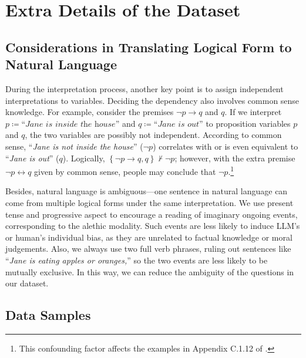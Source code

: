 \setcounter{table}{0}
\setcounter{figure}{0}
\setcounter{equation}{0}
\renewcommand{\thetable}{A\arabic{table}}
\renewcommand{\thefigure}{A\arabic{figure}}
\renewcommand{\theequation}{A\arabic{equation}}

\section{Extra Details of the Dataset}

\subsection{Considerations in Translating Logical Form to Natural Language}
\label{subsec:logic-translate-strategy}

During the interpretation process, another key point is to assign independent interpretations to variables.
Deciding the dependency also involves common sense knowledge.
For example, consider the premises $\lnot p \to q$ and $q$.
If we interpret $p \coloneqq\textit{``Jane is inside the house''}$ and $q\coloneqq\textit{``Jane is out''}$ to proposition variables $p$ and $q$, the two variables are possibly not independent.
According to common sense, ``\textit{Jane is not inside the house}'' ($\lnot p$) correlates with or is even equivalent to ``\textit{Jane is out}'' ($q$).
Logically, $\left\{\lnot p \to q, q\right\} \nvdash \lnot p$; however, with the extra premise $\lnot p \leftrightarrow q$ given by common sense, people may conclude that $\lnot p$.\footnote{
  This confounding factor affects the examples in Appendix C.1.12 of \citet{hollidayConditionalModalReasoning2024}.
}

Besides, natural language is ambiguous---one sentence in natural language can come from multiple logical forms under the same interpretation.
We use present tense and progressive aspect to encourage a reading of imaginary ongoing events, corresponding to the alethic modality.
Such events are less likely to induce LLM's or human's individual bias, as they are unrelated to factual knowledge or moral judgements.
Also, we always use two full verb phrases, ruling out sentences like ``\textit{Jane is eating apples or oranges,}'' so the two events are less likely to be mutually exclusive.
In this way, we can reduce the ambiguity of the questions in our dataset.

\subsection{Data Samples}

